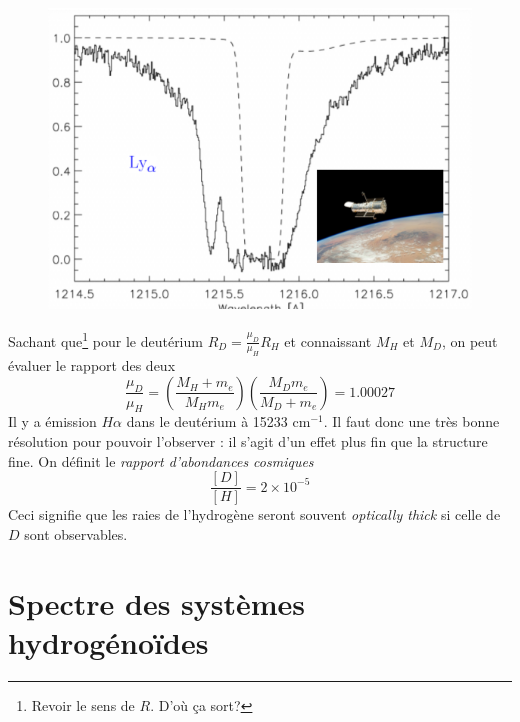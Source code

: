 	\begin{figure}
	\includegraphics[scale=0.3]{ch1/image6}
	\end{figure}
Sachant que\footnote{Revoir le sens de $R$. D'où ça sort?} pour le deutérium $R_D = \frac{\mu_D}{\mu_H}R_H$ 
et connaissant $M_H$ et $M_D$, on peut évaluer le rapport des deux
\begin{equation}
\frac{\mu_D}{\mu_H} = \left(\frac{M_H+m_e}{M_Hm_e}\right)\left(\frac{M_Dm_e}{M_D+m_e}\right)=1.00027
\end{equation}
Il y a émission $H\alpha$ dans le deutérium à 15233 cm$^{-1}$. Il faut donc une très bonne résolution pour
pouvoir l'observer : il s'agit d'un effet plus fin que la structure fine. On définit le \textit{rapport 
d'abondances cosmiques}
\begin{equation}
\frac{[D]}{[H]}=2\times 10^{-5}
\end{equation}
Ceci signifie que les raies de l'hydrogène seront souvent \textit{optically thick} si celle de $D$ sont 
observables.

\section{Spectre des systèmes hydrogénoïdes}

